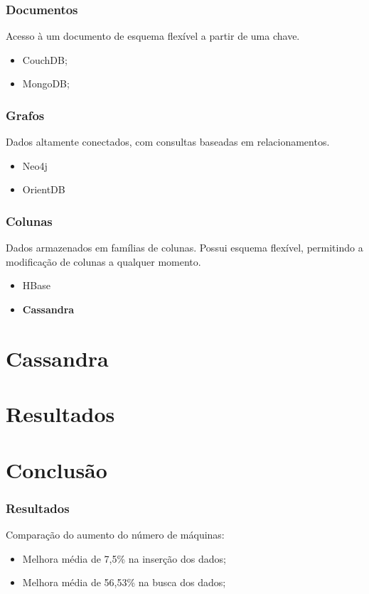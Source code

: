 \documentclass[brazil]{beamer}
\begin{document}
\begin{frame}
	\frametitle{Documentos}
		Acesso à um documento de esquema flexível a partir de uma chave.
		\begin{itemize}
			\item CouchDB;
			\item MongoDB;
		\end{itemize}
\end{frame}

\begin{frame}
	\frametitle{Grafos}
		Dados altamente conectados, com consultas baseadas em relacionamentos.
		\begin{itemize}
			\item Neo4j
			\item OrientDB
		\end{itemize}
\end{frame}

\begin{frame}
	\frametitle{Colunas}
		Dados armazenados em famílias de colunas. Possui esquema flexível, permitindo a modificação de colunas a qualquer momento.
		\begin{itemize}
			\item HBase
			\item \textbf{Cassandra}
		\end{itemize}
\end{frame}

\section{Cassandra}


\section{Resultados}


\section{Conclusão}
\begin{frame}
\frametitle{Resultados}
	Comparação do aumento do número de máquinas:
\begin{itemize}
	\item Melhora média de 7,5\% na inserção dos dados;
	\item Melhora média de 56,53\% na busca dos dados;
\end{itemize}
\end{frame}
\end{document}
